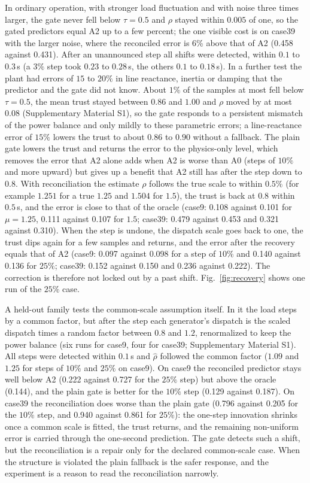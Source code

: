 \documentclass[preprint,12pt]{elsarticle}
\begin{document}
In ordinary operation, with stronger load fluctuation and with noise three times larger, the gate never fell below $\tau=0.5$ and $\rho$ stayed within $0.005$ of one, so the gated predictors equal A2 up to a few percent; the one visible cost is on case39 with the larger noise, where the reconciled error is 6\% above that of A2 (0.458 against 0.431). After an unannounced step all shifts were detected, within $0.1$ to $0.3$\,s (a $3\%$ step took $0.23$ to $0.28$\,s, the others $0.1$ to $0.18$\,s). In a further test the plant had errors of $15$ to $20\%$ in line reactance, inertia or damping that the predictor and the gate did not know. About $1\%$ of the samples at most fell below $\tau=0.5$, the mean trust stayed between $0.86$ and $1.00$ and $\rho$ moved by at most $0.08$ (Supplementary Material S1), so the gate responds to a persistent mismatch of the power balance and only mildly to these parametric errors; a line-reactance error of $15\%$ lowers the trust to about $0.86$ to $0.90$ without a fallback. The plain gate lowers the trust and returns the error to the physics-only level, which removes the error that A2 alone adds when A2 is worse than A0 (steps of $10\%$ and more upward) but gives up a benefit that A2 still has after the step down to $0.8$. With reconciliation the estimate $\rho$ follows the true scale to within $0.5\%$ (for example $1.251$ for a true $1.25$ and $1.504$ for $1.5$), the trust is back at $0.8$ within $0.5$\,s, and the error is close to that of the oracle (case9: 0.108 against 0.101 for $\mu=1.25$, 0.111 against 0.107 for $1.5$; case39: 0.479 against 0.453 and 0.321 against 0.310). When the step is undone, the dispatch scale goes back to one, the trust dips again for a few samples and returns, and the error after the recovery equals that of A2 (case9: 0.097 against 0.098 for a step of $10\%$ and 0.140 against 0.136 for $25\%$; case39: 0.152 against 0.150 and 0.236 against 0.222). The correction is therefore not locked out by a past shift. Fig.~\ref{fig:recovery} shows one run of the $25\%$ case.

A held-out family tests the common-scale assumption itself. In it the load steps by a common factor, but after the step each generator's dispatch is the scaled dispatch times a random factor between $0.8$ and $1.2$, renormalized to keep the power balance (six runs for case9, four for case39; Supplementary Material S1). All steps were detected within $0.1$\,s and $\hat\rho$ followed the common factor ($1.09$ and $1.25$ for steps of $10\%$ and $25\%$ on case9). On case9 the reconciled predictor stays well below A2 (0.222 against 0.727 for the $25\%$ step) but above the oracle (0.144), and the plain gate is better for the $10\%$ step (0.129 against 0.187). On case39 the reconciliation does worse than the plain gate (0.796 against 0.205 for the $10\%$ step, and 0.940 against 0.861 for $25\%$): the one-step innovation shrinks once a common scale is fitted, the trust returns, and the remaining non-uniform error is carried through the one-second prediction. The gate detects such a shift, but the reconciliation is a repair only for the declared common-scale case. When the structure is violated the plain fallback is the safer response, and the experiment is a reason to read the reconciliation narrowly.
\end{document}
